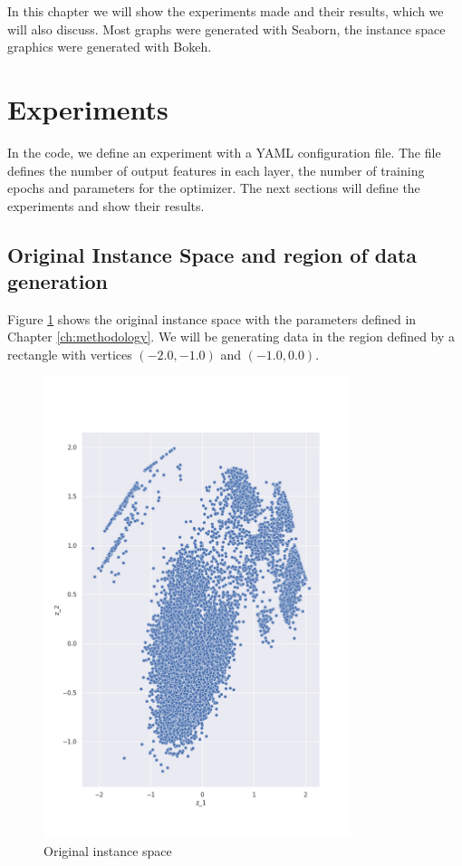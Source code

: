 In this chapter we will show the experiments made and their results, which we will also discuss. Most graphs were generated with Seaborn, the instance space graphics were generated with Bokeh.

\section{Experiments} \label{sec:experiments}

In the code, we define an experiment with a YAML configuration file. The file defines the number of output features in each layer, the number of training epochs and parameters for the optimizer. The next sections will define the experiments and show their results.

\subsection{Original Instance Space and region of data generation}

Figure \ref{fig:is_original} shows the original instance space with the parameters defined in Chapter \ref{ch:methodology}. We will be generating data in the region defined by a rectangle with vertices $(-2.0, -1.0)$ and $(-1.0, 0.0)$.

\begin{figure}[H]
    \centering
    \includegraphics[width=0.8\textwidth]{Cap5/is_original.png}
    \caption{Original instance space}
    \label{fig:is_original}
\end{figure}

